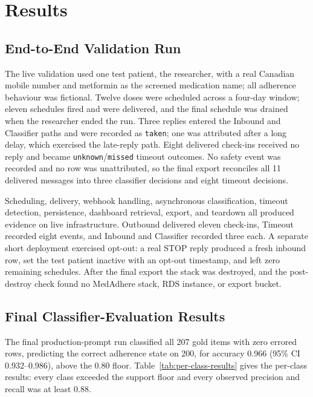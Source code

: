 \chapter{Results}
\label{ch:results}

\section{End-to-End Validation Run}
\label{sec:results-live}

The live validation used one test patient, the researcher, with a real Canadian
mobile number and metformin as the screened medication name; all adherence
behaviour was fictional. Twelve doses were scheduled across a four-day window;
eleven schedules fired and were delivered, and the final schedule was drained
when the researcher ended the run. Three replies entered the Inbound and
Classifier paths and were recorded as \texttt{taken}; one was attributed after a
long delay, which exercised the late-reply path. Eight delivered check-ins
received no reply and became \texttt{unknown}/\texttt{missed} timeout outcomes.
No safety event was recorded and no row was unattributed, so the final export
reconciles all 11 delivered messages into three classifier decisions and eight
timeout decisions.

Scheduling, delivery, webhook handling, asynchronous classification, timeout
detection, persistence, dashboard retrieval, export, and teardown all produced
evidence on live infrastructure. Outbound delivered eleven check-ins, Timeout
recorded eight events, and Inbound and Classifier recorded three each. A
separate short deployment exercised opt-out: a real STOP reply produced a fresh
inbound row, set the test patient inactive with an opt-out timestamp, and left
zero remaining schedules. After the final export the stack was destroyed, and
the post-destroy check found no MedAdhere stack, RDS instance, or export
bucket.

\section{Final Classifier-Evaluation Results}

The final production-prompt run classified all 207 gold items with zero errored
rows, predicting the correct adherence state on 200, for accuracy 0.966 (95\% CI
0.932--0.986), above the 0.80 floor. Table~\ref{tab:per-class-results} gives the
per-class results: every class exceeded the support floor and every observed
precision and recall was at least 0.88.

